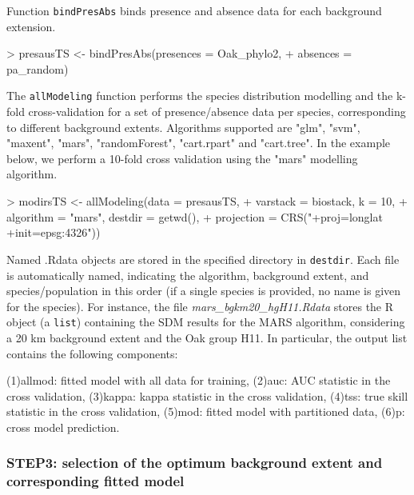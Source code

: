 \documentclass[10pt,a4paper]{article}
\begin{document}
Function \texttt{bindPresAbs} binds presence and absence data for each background extension.

\begin{Schunk}
\begin{Sinput}
> presausTS <- bindPresAbs(presences = Oak_phylo2, 
+                        absences = pa_random)
\end{Sinput}
\end{Schunk}

The \texttt{allModeling} function performs the species distribution modelling and the k-fold cross-validation for a set of presence/absence data per species, corresponding to different background 
extents. Algorithms supported are "glm", "svm", "maxent", "mars", "randomForest", "cart.rpart" 
and "cart.tree". In the example below, we perform a 10-fold cross validation using the "mars" modelling algorithm.


\begin{Schunk}
\begin{Sinput}
> modirsTS <- allModeling(data = presausTS, 
+                      varstack = biostack, k = 10, 
+                      algorithm = "mars", destdir = getwd(), 
+                 projection = CRS("+proj=longlat +init=epsg:4326"))
\end{Sinput}
\end{Schunk}

Named .Rdata objects are stored in the specified directory in \texttt{destdir}. Each file is automatically named, indicating the algorithm, background extent, and species/population in this order (if a single species is provided, no name is given for the species). For instance, the file \textit{mars\_bgkm20\_hgH11.Rdata} stores the R object (a \texttt{list}) containing the SDM results for the MARS algorithm, considering a 20 km background extent and the Oak group H11. In particular, the output list contains the following components:

	(1)allmod: fitted model with all data for training, 
	(2)auc: AUC statistic in the cross validation,
	(3)kappa: kappa statistic in the cross validation,
	(4)tss: true skill statistic in the cross validation,
	(5)mod: fitted model with partitioned data, 
	(6)p: cross model prediction. 

\subsubsection{STEP3: selection of the optimum background extent and corresponding fitted model}
\end{document}
